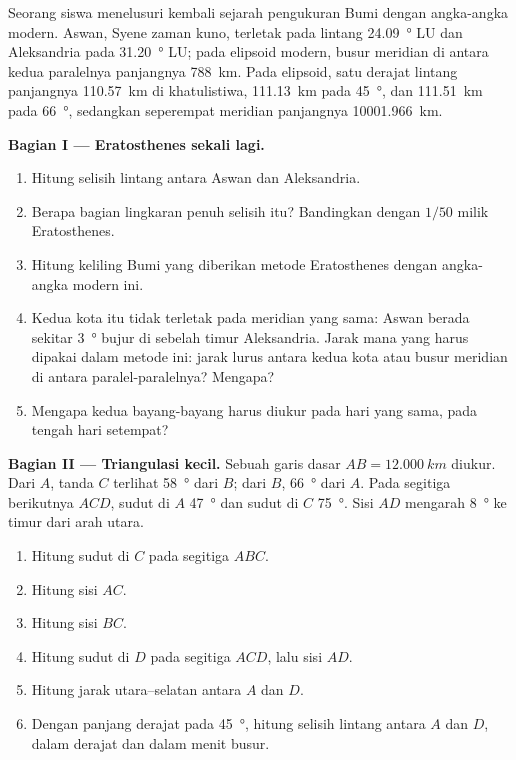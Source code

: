 \begin{problem}
\label{pb:g10:measuring-the-earth:1}
Seorang siswa menelusuri kembali sejarah pengukuran Bumi dengan angka-angka
modern. Aswan, Syene zaman kuno, terletak pada lintang
\qty{24.09}{\degree} LU dan Aleksandria pada \qty{31.20}{\degree} LU; pada
elipsoid modern, busur meridian di antara kedua paralelnya panjangnya
\qty{788}{km}. Pada elipsoid, satu derajat lintang panjangnya
\qty{110.57}{km} di khatulistiwa, \qty{111.13}{km} pada \qty{45}{\degree},
dan \qty{111.51}{km} pada \qty{66}{\degree}, sedangkan seperempat meridian
panjangnya \qty{10001.966}{km}.

\medskip
\noindent\textbf{Bagian I --- Eratosthenes sekali lagi.}
\begin{enumerate}
  \item Hitung selisih lintang antara Aswan dan Aleksandria.
  \item Berapa bagian lingkaran penuh selisih itu? Bandingkan dengan $1/50$
        milik Eratosthenes.
  \item Hitung keliling Bumi yang diberikan metode Eratosthenes dengan
        angka-angka modern ini.
  \item Kedua kota itu tidak terletak pada meridian yang sama: Aswan berada
        sekitar \qty{3}{\degree} bujur di sebelah timur Aleksandria. Jarak
        mana yang harus dipakai dalam metode ini: jarak lurus antara kedua
        kota atau busur meridian di antara paralel-paralelnya? Mengapa?
  \item Mengapa kedua bayang-bayang harus diukur pada hari yang sama, pada
        tengah hari setempat?
\end{enumerate}

\medskip
\noindent\textbf{Bagian II --- Triangulasi kecil.}
Sebuah garis dasar $AB = \qty{12.000}{km}$ diukur. Dari $A$, tanda $C$
terlihat \qty{58}{\degree} dari $B$; dari $B$, \qty{66}{\degree} dari $A$.
Pada segitiga berikutnya $ACD$, sudut di $A$ \qty{47}{\degree} dan sudut di
$C$ \qty{75}{\degree}. Sisi $AD$ mengarah \qty{8}{\degree} ke timur dari arah
utara.
\begin{enumerate}[resume]
  \item Hitung sudut di $C$ pada segitiga $ABC$.
  \item Hitung sisi $AC$.
  \item Hitung sisi $BC$.
  \item Hitung sudut di $D$ pada segitiga $ACD$, lalu sisi $AD$.
  \item Hitung jarak utara--selatan antara $A$ dan $D$.
  \item Dengan panjang derajat pada \qty{45}{\degree}, hitung selisih
        lintang antara $A$ dan $D$, dalam derajat dan dalam menit busur.
\end{enumerate}


\end{problem}
